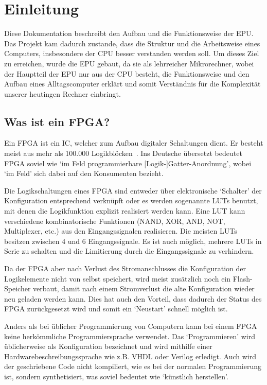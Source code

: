 \chapter{Einleitung}
\label{c:einleitung}
Diese Dokumentation beschreibt den Aufbau und die Funktionsweise der \ac{EPU}.
Das Projekt kam dadurch zustande, dass die Struktur und die Arbeitsweise eines
Computers, insbesondere der \ac{CPU} besser verstanden werden soll. Um dieses
Ziel zu erreichen, wurde die \ac{EPU} gebaut, da sie als lehrreicher
Mikrorechner, wobei der Hauptteil der \ac{EPU} nur aus der \ac{CPU} besteht,
die Funktionsweise und den Aufbau eines Alltagscomputer erklärt und somit
Verständnis für die Komplexität unserer heutingen Rechner einbringt.

\section{Was ist ein FPGA?}
Ein \ac{FPGA} ist ein \ac{IC}, welcher zum Aufbau digitaler Schaltungen
dient. Er besteht meist aus mehr als 100.000 Logikblöcken~\cite[S. 8]{minicpu}.
Ins Deutsche übersetzt bedeutet \ac{FPGA} soviel wie `im Feld programmierbare
[Logik-]Gatter-Anordnung', wobei `im Feld' sich dabei auf den Konsumenten
bezieht.

Die Logikschaltungen eines \ac{FPGA} sind entweder über elektronische `Schalter'
der Konfiguration entsprechend verknüpft oder es werden sogenannte \acp{LUT}
benutzt, mit denen die Logikfunktion explizit realisiert werden kann. Eine
\ac{LUT} kann verschiedene kombinatorische Funktionen (NAND, XOR, AND, NOT,
Multiplexer, etc.) aus den Eingangssignalen realisieren. Die meisten \acp{LUT}
besitzen zwischen 4 und 6 Eingangssignale. Es ist auch möglich, mehrere
\acp{LUT} in Serie zu schalten und die Limitierung durch die Eingangssignale zu
verhindern.~\cite{FPGA_Aufbau}

Da der \ac{FPGA} aber nach Verlust des Stromanschlusses die Konfiguration der
Logikelemente nicht von selbst speichert, wird meist zusätzlich noch ein
Flash-Speicher verbaut, damit nach einem Stromverlust die alte Konfiguration
wieder neu geladen werden kann. Dies hat auch den Vorteil, dass dadurch der
Status des \ac{FPGA} zurückgesetzt wird und somit ein `Neustart' schnell möglich
ist.

Anders als bei üblicher Programmierung von Computern kann bei einem \ac{FPGA}
keine herkömmliche Programmiersprache verwendet. Das `Programmieren' wird
üblicherweise als Konfiguration bezeichnet und wird mithilfe einer
Hardwarebeschreibungssprache wie z.B. VHDL oder Verilog erledigt. Auch wird der
geschriebene Code nicht kompiliert, wie es bei der normalen Programmierung ist,
sondern synthetisiert, was soviel bedeutet wie `künstlich herstellen'.
